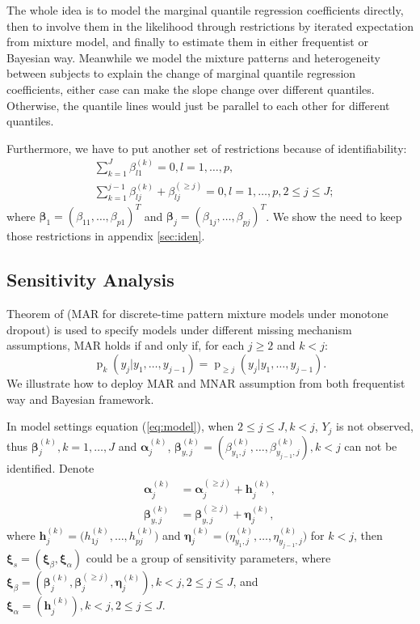 \documentclass[12pt]{article}
\DeclareMathOperator{\pr}{p}
\begin{document}
The whole idea is to model the marginal quantile regression
coefficients directly, then to involve them in the likelihood through
restrictions by iterated expectation from mixture model, and finally
to estimate them in either frequentist or Bayesian way. Meanwhile we
model the mixture patterns and heterogeneity between subjects to
explain the change of marginal quantile regression coefficients,
either case can make the slope change over different
quantiles. Otherwise, the quantile lines would just be parallel to
each other for different quantiles.

Furthermore, we have to put another set of restrictions because of
identifiability:
\begin{align*}
  & \sum_{k=1}^J \beta_{l1}^{(k)} = 0, l = 1,\ldots, p, \\
  & \sum_{k=1}^{j-1} \beta_{lj}^{(k)} + \beta_{lj}^{(\geq j)} = 0, l = 1, \ldots, p,
  2 \leq j \leq J;
\end{align*}
where $\bm \beta_1 = (\beta_{11}, \ldots, \beta_{p1})^T$ and $\bm \beta_j = (\beta_{1j},
\ldots, \beta_{pj})^{T}$. We show the need to keep those restrictions
in appendix \ref{sec:iden}.

\subsection{Sensitivity Analysis}
\label{sec:sa}

Theorem of \citet{molen1998} (MAR for
discrete-time pattern mixture models under monotone dropout) is used
to specify models under different missing mechanism assumptions, MAR
holds if and only if, for each $j \geq 2$ and $k < j$:
\begin{equation}
  \label{eq:molen}
  \pr_k(y_j|y_1, \ldots, y_{j-1}) = \pr_{\geq j}(y_j|y_1, \ldots, y_{j-1}).
\end{equation}
We illustrate how to deploy MAR and MNAR assumption from both
frequentist way and Bayesian framework.

In model settings equation (\ref{eq:model}), when $2 \leq j \leq J, k
< j$, $Y_j$ is not observed, thus $\bm \beta_j^{(k)}, k = 1, \ldots,
J$ and $\bm \alpha_j^{(k)}$, $ \bm \beta_{y, j}^{(k)} =
(\beta_{y_1,j}^{(k)}, \ldots, \beta_{y_{j-1},j}^{(k)}), k < j$ can not
be identified. Denote
\begin{align*}
  \bm \alpha_j^{(k)} &= \bm \alpha_j^{(\geq j)} + \bm h_j^{(k)}, \\
  \bm \beta_{y, j}^{(k)} &= \bm \beta_{y, j}^{(\geq j)} + \bm
  \eta_j^{(k)},
\end{align*}
where $\bm h_j^{(k)} = \big( h_{1j}^{(k)}, \ldots, h_{pj}^{(k)} \big)$
and $\bm \eta_j^{(k)} = \big( \eta_{y_1,j}^{(k)}, \ldots,
\eta_{y_{j-1}, j}^{(k)} \big)$ for $k < j$, then $\bm \xi_s = ( \bm
\xi_{\beta} , \bm \xi_{\alpha})$ could be a group of sensitivity
parameters, where $\bm \xi_{\beta} = (\bm \beta_j^{(k)}, \bm
\beta_j^{(\geq j)}, \bm \eta_j^{(k)}), k < j, 2 \leq j \leq J $, and
$\bm \xi_{\alpha} = (\bm h_j^{(k)}) , k < j, 2 \leq j \leq J$.
\end{document}
